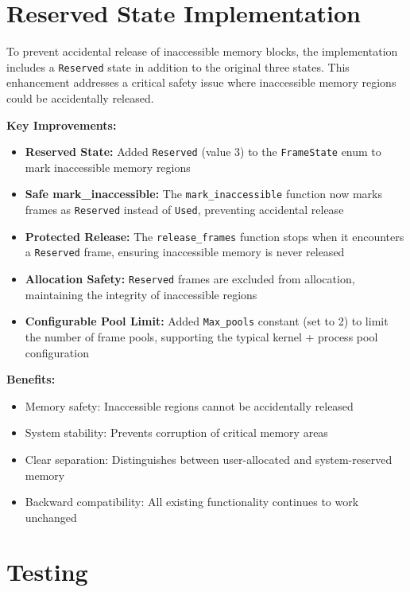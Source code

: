 \documentclass{article}
\begin{document}
\section*{Reserved State Implementation}

To prevent accidental release of inaccessible memory blocks, the implementation includes a \texttt{Reserved} state in addition to the original three states. This enhancement addresses a critical safety issue where inaccessible memory regions could be accidentally released.

\textbf{Key Improvements:}

\begin{itemize}
    \item \textbf{Reserved State:} Added \texttt{Reserved} (value 3) to the \texttt{FrameState} enum to mark inaccessible memory regions
    \item \textbf{Safe mark\_inaccessible:} The \texttt{mark\_inaccessible} function now marks frames as \texttt{Reserved} instead of \texttt{Used}, preventing accidental release
    \item \textbf{Protected Release:} The \texttt{release\_frames} function stops when it encounters a \texttt{Reserved} frame, ensuring inaccessible memory is never released
    \item \textbf{Allocation Safety:} \texttt{Reserved} frames are excluded from allocation, maintaining the integrity of inaccessible regions
    \item \textbf{Configurable Pool Limit:} Added \texttt{Max\_pools} constant (set to 2) to limit the number of frame pools, supporting the typical kernel + process pool configuration
\end{itemize}

\textbf{Benefits:}
\begin{itemize}
    \item Memory safety: Inaccessible regions cannot be accidentally released
    \item System stability: Prevents corruption of critical memory areas
    \item Clear separation: Distinguishes between user-allocated and system-reserved memory
    \item Backward compatibility: All existing functionality continues to work unchanged
\end{itemize}

\section*{Testing}
\end{document}
